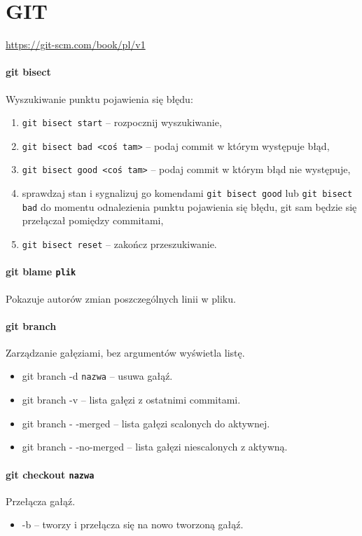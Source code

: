 \section{GIT}

\url{https://git-scm.com/book/pl/v1}

\paragraph{git bisect\\}
Wyszukiwanie punktu pojawienia się błędu:
\begin{enumerate}
	\item \texttt{git bisect start} -- rozpocznij wyszukiwanie,
	\item \texttt{git bisect bad <coś tam>} -- podaj commit w którym występuje błąd,
	\item \texttt{git bisect good <coś tam>} -- podaj commit w którym błąd nie występuje,
	\item sprawdzaj stan i sygnalizuj go komendami \texttt{git bisect good} lub \texttt{git bisect bad} do momentu odnalezienia punktu pojawienia się błędu, git sam będzie się przełączał pomiędzy commitami,
	\item \texttt{git bisect reset} -- zakończ przeszukiwanie.
\end{enumerate}

\paragraph{git blame \texttt{plik}\\}
Pokazuje autorów zmian poszczególnych linii w pliku.

\paragraph{git branch\\}
Zarządzanie gałęziami, bez argumentów wyświetla listę.
\begin{itemize}
	\item git branch -d \texttt{nazwa} -- usuwa gałąź.
	\item git branch -v -- lista gałęzi z ostatnimi commitami.
	\item git branch - -merged -- lista gałęzi scalonych do aktywnej.
	\item git branch - -no-merged -- lista gałęzi niescalonych z aktywną.
\end{itemize}

\paragraph{git checkout \texttt{nazwa}\\}
Przełącza gałąź.
\begin{itemize}
	\item -b -- tworzy i przełącza się na nowo tworzoną gałąź.
\end{itemize}

